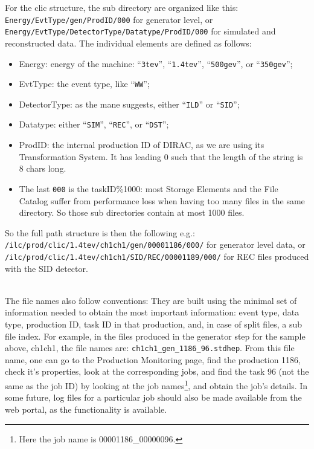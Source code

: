 \documentclass[11pt,a4paper]{scrartcl}
\begin{document}
For the clic structure, the sub directory are organized like this:\\
\lstinline[language=bash]|Energy/EvtType/gen/ProdID/000| for generator level,
or\\
\lstinline[language=bash]|Energy/EvtType/DetectorType/Datatype/ProdID/000|
for simulated and reconstructed data. The individual elements are defined as follows:
\begin{itemize}
  \item Energy: energy of the machine: ``\lstinline|3tev|'',
  ``\lstinline|1.4tev|'', ``\lstinline|500gev|'', or ``\lstinline|350gev|'';
  \item EvtType: the event type, like ``\lstinline|WW|'';
  \item DetectorType: as the mane suggests, either ``\lstinline|ILD|'' or
  ``\lstinline|SID|'';
  \item Datatype: either ``\lstinline|SIM|'', ``\lstinline|REC|'', or
  ``\lstinline|DST|'';
  \item ProdID: the internal production ID of DIRAC, as we are using its
  Transformation System. It has leading 0 such that the length of the string is
  8 chars long.
  \item The last \lstinline|000| is the taskID\%1000: most Storage Elements and
  the File Catalog suffer from performance loss when having too many files in the same
  directory. So those sub directories contain at most 1000 files.
\end{itemize}

So the full path structure is then the following e.g.:\\
\lstinline[language=bash]|/ilc/prod/clic/1.4tev/ch1ch1/gen/00001186/000/| for
generator level data, or \\
\lstinline[language=bash]|/ilc/prod/clic/1.4tev/ch1ch1/SID/REC/00001189/000/|
for REC files produced with the SID detector.

~\\

The file names also follow conventions: They are built using the minimal
set of information needed to obtain the most important information: event type,
data type, production ID, task ID in that production, and, in case of split
files, a sub file index. For example, in the files produced in the generator
step for the sample above, ch1ch1, the file names are:
\lstinline[language=bash]|ch1ch1_gen_1186_96.stdhep|.  From this file name,
one can go to the Production Monitoring page, find the production 1186, check
it's properties, look at  the corresponding jobs, and find the task 96 (not the 
same as the job ID) by looking at  the job names\footnote{Here the job name is 
00001186\_00000096.}, and obtain the job's details. In some future, log files 
for a particular job should also be made available from the web portal, as the 
functionality is available.
\end{document}

